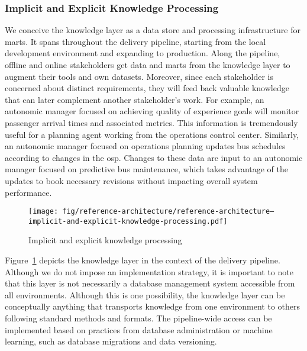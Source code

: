 \subsubsection{Implicit and Explicit Knowledge Processing}
\label{subsect:reference-architecture--implicit-and-explicit-knowledge-processing}

We conceive the knowledge layer as a data store and processing infrastructure for \glspl{mart}. It spans throughout the delivery pipeline, starting from the local development environment and expanding to production. Along the pipeline, offline and online stakeholders get data and \glspl{mart} from the knowledge layer to augment their tools and own datasets. Moreover, since each stakeholder is concerned about distinct requirements, they will feed back valuable knowledge that can later complement another stakeholder's work. For example, an autonomic manager focused on achieving quality of experience goals will monitor passenger arrival times and associated metrics. This information is tremendously useful for a planning agent working from the operations control center. Similarly, an autonomic manager focused on operations planning updates bus schedules according to changes in the \gls{osp}. Changes to these data are input to an autonomic manager focused on predictive bus maintenance, which takes advantage of the updates to book necessary revisions without impacting overall system performance.

\begin{figure}[h]
	\centering
	\texttt{[image: fig/reference-architecture/reference-architecture--implicit-and-explicit-knowledge-processing.pdf]}
	\caption{Implicit and explicit knowledge processing}
	\label{fig:reference-architecture--implicit-and-explicit-knowledge-processing}
\end{figure}

Figure~\ref{fig:reference-architecture--implicit-and-explicit-knowledge-processing} depicts the knowledge layer in the context of the delivery pipeline. Although we do not impose an implementation strategy, it is important to note that this layer is not necessarily a database management system accessible from all environments. Although this is one possibility, the knowledge layer can be conceptually anything that transports knowledge from one environment to others following standard methods and formats. The pipeline-wide access can be implemented based on practices from database administration or machine learning, such as database migrations and data versioning.


